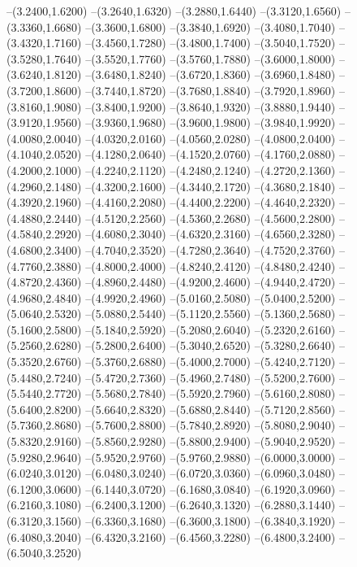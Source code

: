 {	--(3.2400,1.6200)
	--(3.2640,1.6320)
	--(3.2880,1.6440)
	--(3.3120,1.6560)
	--(3.3360,1.6680)
	--(3.3600,1.6800)
	--(3.3840,1.6920)
	--(3.4080,1.7040)
	--(3.4320,1.7160)
	--(3.4560,1.7280)
	--(3.4800,1.7400)
	--(3.5040,1.7520)
	--(3.5280,1.7640)
	--(3.5520,1.7760)
	--(3.5760,1.7880)
	--(3.6000,1.8000)
	--(3.6240,1.8120)
	--(3.6480,1.8240)
	--(3.6720,1.8360)
	--(3.6960,1.8480)
	--(3.7200,1.8600)
	--(3.7440,1.8720)
	--(3.7680,1.8840)
	--(3.7920,1.8960)
	--(3.8160,1.9080)
	--(3.8400,1.9200)
	--(3.8640,1.9320)
	--(3.8880,1.9440)
	--(3.9120,1.9560)
	--(3.9360,1.9680)
	--(3.9600,1.9800)
	--(3.9840,1.9920)
	--(4.0080,2.0040)
	--(4.0320,2.0160)
	--(4.0560,2.0280)
	--(4.0800,2.0400)
	--(4.1040,2.0520)
	--(4.1280,2.0640)
	--(4.1520,2.0760)
	--(4.1760,2.0880)
	--(4.2000,2.1000)
	--(4.2240,2.1120)
	--(4.2480,2.1240)
	--(4.2720,2.1360)
	--(4.2960,2.1480)
	--(4.3200,2.1600)
	--(4.3440,2.1720)
	--(4.3680,2.1840)
	--(4.3920,2.1960)
	--(4.4160,2.2080)
	--(4.4400,2.2200)
	--(4.4640,2.2320)
	--(4.4880,2.2440)
	--(4.5120,2.2560)
	--(4.5360,2.2680)
	--(4.5600,2.2800)
	--(4.5840,2.2920)
	--(4.6080,2.3040)
	--(4.6320,2.3160)
	--(4.6560,2.3280)
	--(4.6800,2.3400)
	--(4.7040,2.3520)
	--(4.7280,2.3640)
	--(4.7520,2.3760)
	--(4.7760,2.3880)
	--(4.8000,2.4000)
	--(4.8240,2.4120)
	--(4.8480,2.4240)
	--(4.8720,2.4360)
	--(4.8960,2.4480)
	--(4.9200,2.4600)
	--(4.9440,2.4720)
	--(4.9680,2.4840)
	--(4.9920,2.4960)
	--(5.0160,2.5080)
	--(5.0400,2.5200)
	--(5.0640,2.5320)
	--(5.0880,2.5440)
	--(5.1120,2.5560)
	--(5.1360,2.5680)
	--(5.1600,2.5800)
	--(5.1840,2.5920)
	--(5.2080,2.6040)
	--(5.2320,2.6160)
	--(5.2560,2.6280)
	--(5.2800,2.6400)
	--(5.3040,2.6520)
	--(5.3280,2.6640)
	--(5.3520,2.6760)
	--(5.3760,2.6880)
	--(5.4000,2.7000)
	--(5.4240,2.7120)
	--(5.4480,2.7240)
	--(5.4720,2.7360)
	--(5.4960,2.7480)
	--(5.5200,2.7600)
	--(5.5440,2.7720)
	--(5.5680,2.7840)
	--(5.5920,2.7960)
	--(5.6160,2.8080)
	--(5.6400,2.8200)
	--(5.6640,2.8320)
	--(5.6880,2.8440)
	--(5.7120,2.8560)
	--(5.7360,2.8680)
	--(5.7600,2.8800)
	--(5.7840,2.8920)
	--(5.8080,2.9040)
	--(5.8320,2.9160)
	--(5.8560,2.9280)
	--(5.8800,2.9400)
	--(5.9040,2.9520)
	--(5.9280,2.9640)
	--(5.9520,2.9760)
	--(5.9760,2.9880)
	--(6.0000,3.0000)
	--(6.0240,3.0120)
	--(6.0480,3.0240)
	--(6.0720,3.0360)
	--(6.0960,3.0480)
	--(6.1200,3.0600)
	--(6.1440,3.0720)
	--(6.1680,3.0840)
	--(6.1920,3.0960)
	--(6.2160,3.1080)
	--(6.2400,3.1200)
	--(6.2640,3.1320)
	--(6.2880,3.1440)
	--(6.3120,3.1560)
	--(6.3360,3.1680)
	--(6.3600,3.1800)
	--(6.3840,3.1920)
	--(6.4080,3.2040)
	--(6.4320,3.2160)
	--(6.4560,3.2280)
	--(6.4800,3.2400)
	--(6.5040,3.2520)
}
